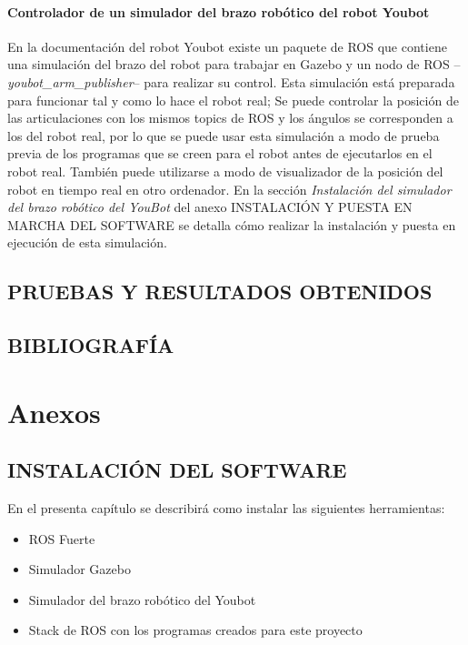 \documentclass[12pt, a4paper]{report}
\begin{document}
\subsection{Controlador de un simulador del brazo robótico del robot Youbot}

En la documentación del robot Youbot existe un paquete de ROS que contiene una simulación del brazo del robot para trabajar en Gazebo y un nodo de ROS --\textit{youbot\_arm\_publisher}-- para realizar su control. Esta simulación está preparada para funcionar tal y como lo hace el robot real; Se puede controlar la posición de las articulaciones con los mismos topics de ROS y los ángulos se corresponden a los del robot real, por lo que se puede usar esta simulación a modo de prueba previa de los programas que se creen para el robot antes de ejecutarlos en el robot real. También puede utilizarse a modo de visualizador de la posición del robot en tiempo real en otro ordenador. En la sección \textit{Instalación del simulador del brazo robótico del YouBot} del anexo INSTALACIÓN Y PUESTA EN MARCHA DEL SOFTWARE se detalla cómo realizar la instalación y puesta en ejecución de esta simulación.

\chapter{PRUEBAS Y RESULTADOS OBTENIDOS}


\chapter{BIBLIOGRAFÍA}



\part{Anexos}

\appendix

\chapter{INSTALACIÓN DEL SOFTWARE}

En el presenta capítulo se describirá como instalar las siguientes herramientas:

\begin{itemize}
\item{ROS Fuerte}
\item{Simulador Gazebo}
\item{Simulador del brazo robótico del Youbot}
\item{Stack de ROS con los programas creados para este proyecto}
\end{itemize}
\end{document}

